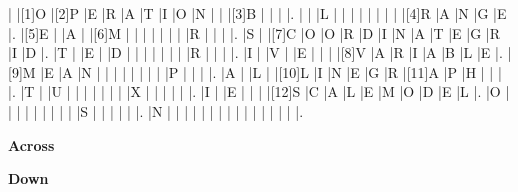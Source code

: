 \documentclass{article}
\begin{document}
\begin{Puzzle}{16}{12}
|{}   |[1]O |[2]P |E  |R     |A  |T     |I  |O    |N  |{}    |{}   |[3]B |{} |{} |{} |.
|{}   |{}   |L    |{} |{}    |{} |{}    |{} |{}   |{} |{}    |[4]R |A    |N  |G  |E  |.
|[5]E |{}   |A    |{} |[6]M  |{} |{}    |{} |{}   |{} |{}    |{}   |R    |{} |{} |{} |.
|S    |{}   |[7]C |O  |O     |R  |D     |I  |N    |A  |T     |E    |G    |R  |I  |D  |.
|T    |{}   |E    |{} |D     |{} |{}    |{} |{}   |{} |{}    |{}   |R    |{} |{} |{} |.
|I    |{}   |V    |{} |E     |{} |{}    |{} |[8]V |A  |R     |I    |A    |B  |L  |E  |.
|[9]M |E    |A    |N  |{}    |{} |{}    |{} |{}   |{} |{}    |{}   |P    |{} |{} |{} |.
|A    |{}   |L    |{} |[10]L |I  |N     |E  |G    |R  |[11]A |P    |H    |{} |{} |{} |.
|T    |{}   |U    |{} |{}    |{} |{}    |{} |{}   |{} |X     |{}   |{}   |{} |{} |{} |.
|I    |{}   |E    |{} |{}    |{} |[12]S |C  |A    |L  |E     |M    |O    |D  |E  |L  |.
|O    |{}   |{}   |{} |{}    |{} |{}    |{} |{}   |{} |S     |{}   |{}   |{} |{} |{} |.
|N    |{}   |{}   |{} |{}    |{} |{}    |{} |{}   |{} |{}    |{}   |{}   |{} |{} |{} |.
\end{Puzzle}

\begin{PuzzleClues}{\textbf{Across}}
\end{PuzzleClues}

\begin{PuzzleClues}{\textbf{Down}}
\end{PuzzleClues}
\end{document}
